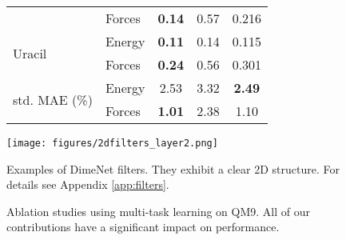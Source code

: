 \documentclass{article} \usepackage{iclr2020_conference,times}
\begin{document}
\begin{figure}
\begin{minipage}{0.54\textwidth}
{\begin{tabular}{llccc}
                         & Forces &  \textbf{\num{0.14}} &           \num{0.57} &           \num{0.216} \\
\cline{1-5}
\multirow{2}{*}{Uracil} & Energy &  \textbf{\num{0.11}} &           \num{0.14} &           \num{0.115} \\
                         & Forces &  \textbf{\num{0.24}} &           \num{0.56} &           \num{0.301} \\
\cline{1-5}
\multirow{2}{*}{std. MAE (\si{\percent})} & Energy &           \num{2.53} &           \num{3.32} &   \textbf{\num{2.49}} \\
                         & Forces &  \textbf{\num{1.01}} &           \num{2.38} &            \num{1.10} \\
\end{tabular}         }
        \label{tab:md17}
    \end{minipage}
    \hfill
    \begin{minipage}{0.44\textwidth}
        \begin{minipage}{\textwidth}
            \centering
            \texttt{[image: figures/2dfilters\_layer2.png]}
            \caption{Examples of DimeNet filters. They exhibit a clear 2D structure. For details see Appendix \ref{app:filters}.}
            \label{fig:filters}
        \end{minipage}
        \begin{minipage}{\textwidth}
            \vspace{\baselineskip}
            \captionsetup{type=table}
            \caption{Ablation studies using multi-task learning on QM9. All of our contributions have a significant impact on performance.}
            \label{tab:ablation}
        \end{minipage}
    \end{minipage}
\end{figure}
\end{document}
